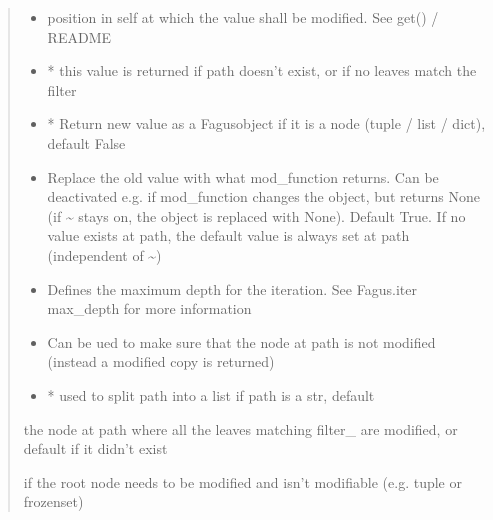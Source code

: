 \documentclass[a4paper,10pt,english]{sphinxmanual}
\begin{document}
\begin{fulllineitems}
\begin{fulllineitems}
\begin{quote}
\begin{description}
\begin{itemize}
\item {}
\sphinxAtStartPar
{} \textendash{} position in self at which the value shall be modified. See get() / README

\item {}
\sphinxAtStartPar
{} \textendash{} * this value is returned if path doesn’t exist, or if no leaves match the filter

\item {}
\sphinxAtStartPar
{} \textendash{} * Return new value as a Fagus\sphinxhyphen{}object if it is a node (tuple / list / dict), default False

\item {}
\sphinxAtStartPar
{} \textendash{} Replace the old value with what mod\_function returns. Can be deactivated e.g. if mod\_function
changes the object, but returns None (if \textasciitilde{} stays on, the object is replaced with None). Default True.
If no value exists at path, the default value is always set at path (independent of \textasciitilde{})

\item {}
\sphinxAtStartPar
{} \textendash{} Defines the maximum depth for the iteration. See Fagus.iter max\_depth for more information

\item {}
\sphinxAtStartPar
{} \textendash{} Can be ued to make sure that the node at path is not modified (instead a modified copy is returned)

\item {}
\sphinxAtStartPar
{} \textendash{} * used to split path into a list if path is a str, default 

\end{itemize}

\sphinxAtStartPar
the node at path where all the leaves matching filter\_ are modified, or default if it didn’t exist

\sphinxAtStartPar
{} \textendash{} if the root node needs to be modified and isn’t modifiable (e.g. tuple or frozenset)

\end{description}\end{quote}


\end{fulllineitems}
\end{fulllineitems}
\end{document}
